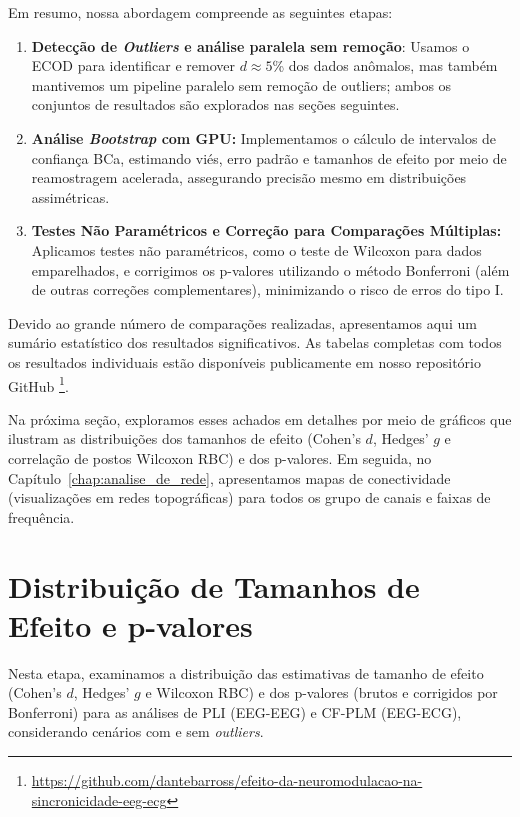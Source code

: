 Em resumo, nossa abordagem compreende as seguintes etapas:
\begin{enumerate}
    \item \textbf{Detecção de \textit{Outliers} e análise paralela sem remoção}: Usamos o ECOD para identificar e remover \(d\approx5\)\%  dos dados anômalos, mas também mantivemos um pipeline paralelo sem remoção de outliers; ambos os conjuntos de resultados são explorados nas seções seguintes.
    \item \textbf{Análise \textit{Bootstrap} com GPU:} Implementamos o cálculo de intervalos de confiança BCa, estimando viés, erro padrão e tamanhos de efeito por meio de reamostragem acelerada, assegurando precisão mesmo em distribuições assimétricas.
    \item \textbf{Testes Não Paramétricos e Correção para Comparações Múltiplas:} Aplicamos testes não paramétricos, como o teste de Wilcoxon para dados emparelhados, e corrigimos os p-valores utilizando o método Bonferroni (além de outras correções complementares), minimizando o risco de erros do tipo I.
\end{enumerate}

Devido ao grande número de comparações realizadas, apresentamos aqui um sumário estatístico dos resultados significativos. As tabelas completas com todos os resultados individuais estão disponíveis publicamente em nosso repositório GitHub \cite{barros2025repository}\footnote{\url{https://github.com/dantebarross/efeito-da-neuromodulacao-na-sincronicidade-eeg-ecg}}.

Na próxima seção, exploramos esses achados em detalhes por meio de gráficos que ilustram as distribuições dos tamanhos de efeito (Cohen's \(d\), Hedges' \(g\) e correlação de postos Wilcoxon RBC) e dos p-valores. Em seguida, no Capítulo~\ref{chap:analise_de_rede}, apresentamos mapas de conectividade (visualizações em redes topográficas) para todos os grupo de canais e faixas de frequência.

\section{Distribuição de Tamanhos de Efeito e p-valores}
\label{sec:effect_size_distribution}
Nesta etapa, examinamos a distribuição das estimativas de tamanho de efeito (Cohen's \(d\), Hedges' \(g\)  e Wilcoxon RBC) e dos p-valores (brutos e corrigidos por Bonferroni) para as análises de PLI (EEG-EEG) e CF-PLM (EEG-ECG), considerando cenários com e sem \textit{outliers}. 

